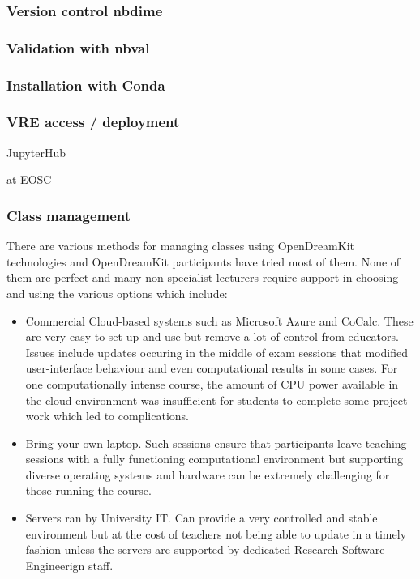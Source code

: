 \documentclass{deliverablereport}
\begin{document}
\subsubsection{Version control nbdime}

\subsubsection{Validation with nbval}

\subsubsection{Installation with Conda}

\subsubsection{VRE access / deployment}

JupyterHub

at EOSC

\subsubsection{Class management}

There are various methods for managing classes using OpenDreamKit
technologies and OpenDreamKit participants have tried most of them. None
of them are perfect and many non-specialist lecturers require support in
choosing and using the various options which include:

\begin{itemize}
\tightlist
\item
  Commercial Cloud-based systems such as Microsoft Azure and CoCalc.
  These are very easy to set up and use but remove a lot of control from
  educators. Issues include updates occuring in the middle of exam
  sessions that modified user-interface behaviour and even computational
  results in some cases. For one computationally intense course, the
  amount of CPU power available in the cloud environment was
  insufficient for students to complete some project work which led to
  complications.
\item
  Bring your own laptop. Such sessions ensure that participants leave
  teaching sessions with a fully functioning computational environment
  but supporting diverse operating systems and hardware can be extremely
  challenging for those running the course.
\item
  Servers ran by University IT. Can provide a very controlled and stable
  environment but at the cost of teachers not being able to update in a
  timely fashion unless the servers are supported by dedicated Research
  Software Engineerign staff.
\end{itemize}
\end{document}
